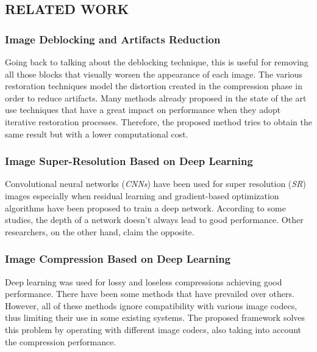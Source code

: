 \subsection{RELATED WORK}
\subsubsection{Image Deblocking and Artifacts Reduction}
Going back to talking about the deblocking technique, this is useful for removing 
all those blocks that visually worsen the appearance of each image. 
The various restoration techniques model the distortion created in the compression 
phase in order to reduce artifacts. Many methods already proposed 
in the state of the art use techniques that have a great impact on performance 
when they adopt iterative restoration processes. Therefore, the proposed 
method tries to obtain the same result but with a lower computational 
cost.

\subsubsection{Image Super-Resolution Based on Deep Learning}
Convolutional neural networks (\emph{CNNs}) have been used for super resolution 
(\emph{SR}) images especially when residual learning and gradient-based optimization 
algorithms have been proposed to train a deep network. According to 
some studies, the depth of a network doesn't always lead to good performance. 
Other researchers, on the other hand, claim the opposite.

\subsubsection{Image Compression Based on Deep Learning}
Deep learning was used for lossy and loseless compressions achieving good 
performance. There have been some methods that have prevailed over others. 
However, all of these methods ignore compatibility with various image codecs, 
thus limiting their use in some existing systems. The proposed framework 
solves this problem by operating with different image codecs, also taking into 
account the compression performance.